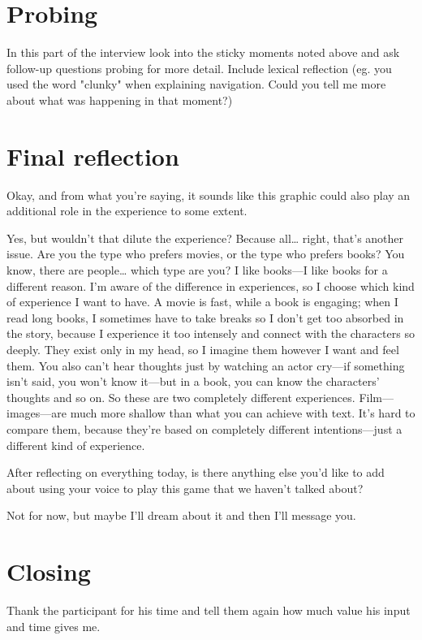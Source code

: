 \section{Probing}
In this part of the interview look into the sticky moments noted above and ask follow-up questions probing for more detail.
Include lexical reflection (eg. you used the word "clunky" when explaining navigation. Could you tell me more about what was happening
in that moment?)


\section{Final reflection}

\begin{QandA}
   \item Okay, and from what you're saying, it sounds like this graphic could also play an additional role in the experience to some extent.
         \begin{answered}
         Yes, but wouldn’t that dilute the experience? Because all… right, that’s another issue. Are you the type who prefers movies, or the type who prefers books? You know, there are people… which type are you? I like books—I like books for a different reason. I’m aware of the difference in experiences, so I choose which kind of experience I want to have. A movie is fast, while a book is engaging; when I read long books, I sometimes have to take breaks so I don’t get too absorbed in the story, because I experience it too intensely and connect with the characters so deeply. They exist only in my head, so I imagine them however I want and feel them. You also can’t hear thoughts just by watching an actor cry—if something isn’t said, you won’t know it—but in a book, you can know the characters’ thoughts and so on. So these are two completely different experiences. Film—images—are much more shallow than what you can achieve with text. It’s hard to compare them, because they’re based on completely different intentions—just a different kind of experience.
         \end{answered}

   \item After reflecting on everything today, is there anything else you’d like to add about using your voice to play this game that we haven't talked about?

         \begin{answered}
         Not for now, but maybe I’ll dream about it and then I’ll message you.
         \end{answered}
\end{QandA}

\section{Closing}
Thank the participant for his time and tell them again how much value his input and time gives me.






